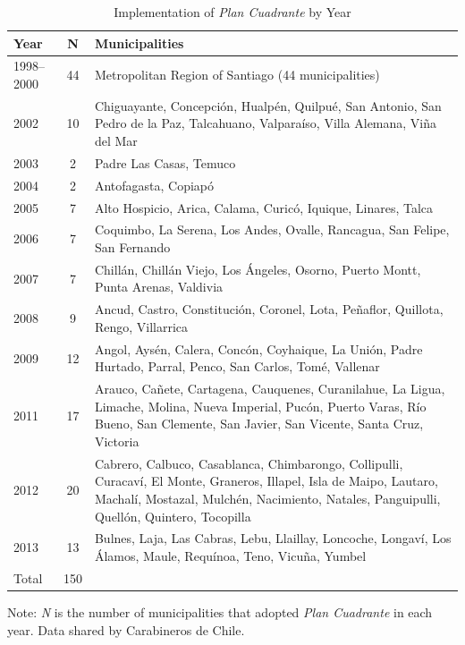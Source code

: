 \begin{table}[H]
\centering
\caption{Implementation of \emph{Plan Cuadrante} by Year}
\label{tab:implementation}
\begin{threeparttable}
\begin{tabular}{l c >{\raggedright\arraybackslash}p{10.5cm}}
\toprule
Year & N & Municipalities \\
\midrule
1998--2000 & 44  & Metropolitan Region of Santiago (44 municipalities) \\[3pt]
2002 & 10  & Chiguayante, Concepción, Hualpén, Quilpué, San Antonio, San Pedro de la Paz, Talcahuano, Valparaíso, Villa Alemana, Viña del Mar \\[3pt]
2003 & 2   & Padre Las Casas, Temuco \\[3pt]
2004 & 2   & Antofagasta, Copiapó \\[3pt]
2005 & 7   & Alto Hospicio, Arica, Calama, Curicó, Iquique, Linares, Talca \\[3pt]
2006 & 7   & Coquimbo, La Serena, Los Andes, Ovalle, Rancagua, San Felipe, San Fernando \\[3pt]
2007 & 7   & Chillán, Chillán Viejo, Los Ángeles, Osorno, Puerto Montt, Punta Arenas, Valdivia \\[3pt]
2008 & 9   & Ancud, Castro, Constitución, Coronel, Lota, Peñaflor, Quillota, Rengo, Villarrica \\[3pt]
2009 & 12  & Angol, Aysén, Calera, Concón, Coyhaique, La Unión, Padre Hurtado, Parral, Penco, San Carlos, Tomé, Vallenar \\[3pt]
2011 & 17  & Arauco, Cañete, Cartagena, Cauquenes, Curanilahue, La Ligua, Limache, Molina, Nueva Imperial, Pucón, Puerto Varas, Río Bueno, San Clemente, San Javier, San Vicente, Santa Cruz, Victoria \\[3pt]
2012 & 20  & Cabrero, Calbuco, Casablanca, Chimbarongo, Collipulli, Curacaví, El Monte, Graneros, Illapel, Isla de Maipo, Lautaro, Machalí, Mostazal, Mulchén, Nacimiento, Natales, Panguipulli, Quellón, Quintero, Tocopilla \\[3pt]
2013 & 13  & Bulnes, Laja, Las Cabras, Lebu, Llaillay, Loncoche, Longaví, Los Álamos, Maule, Requínoa, Teno, Vicuña, Yumbel \\
\midrule
Total & 150 & \\
\bottomrule
\end{tabular}
\begin{tablenotes}[flushleft]
\footnotesize
\item Note: \textit{N} is the number of municipalities that adopted \emph{Plan Cuadrante} in each year. Data shared by Carabineros de Chile.
\end{tablenotes}
\end{threeparttable}
\end{table}
